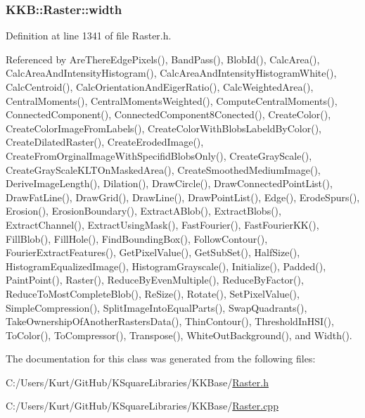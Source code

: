 \subsubsection[{\texorpdfstring{width}{width}}]{ K\+K\+B\+::\+Raster\+::width\hspace{0.3cm}{\ttfamily [protected]}}\hypertarget{class_k_k_b_1_1_raster_ae0bcc103e191c3421d7692dc69ceb554}{}\label{class_k_k_b_1_1_raster_ae0bcc103e191c3421d7692dc69ceb554}


Definition at line 1341 of file Raster.\+h.



Referenced by Are\+There\+Edge\+Pixels(), Band\+Pass(), Blob\+Id(), Calc\+Area(), Calc\+Area\+And\+Intensity\+Histogram(), Calc\+Area\+And\+Intensity\+Histogram\+White(), Calc\+Centroid(), Calc\+Orientation\+And\+Eiger\+Ratio(), Calc\+Weighted\+Area(), Central\+Moments(), Central\+Moments\+Weighted(), Compute\+Central\+Moments(), Connected\+Component(), Connected\+Component8\+Conected(), Create\+Color(), Create\+Color\+Image\+From\+Labels(), Create\+Color\+With\+Blobs\+Labeld\+By\+Color(), Create\+Dilated\+Raster(), Create\+Eroded\+Image(), Create\+From\+Orginal\+Image\+With\+Specifid\+Blobs\+Only(), Create\+Gray\+Scale(), Create\+Gray\+Scale\+K\+L\+T\+On\+Masked\+Area(), Create\+Smoothed\+Medium\+Image(), Derive\+Image\+Length(), Dilation(), Draw\+Circle(), Draw\+Connected\+Point\+List(), Draw\+Fat\+Line(), Draw\+Grid(), Draw\+Line(), Draw\+Point\+List(), Edge(), Erode\+Spurs(), Erosion(), Erosion\+Boundary(), Extract\+A\+Blob(), Extract\+Blobs(), Extract\+Channel(), Extract\+Using\+Mask(), Fast\+Fourier(), Fast\+Fourier\+K\+K(), Fill\+Blob(), Fill\+Hole(), Find\+Bounding\+Box(), Follow\+Contour(), Fourier\+Extract\+Features(), Get\+Pixel\+Value(), Get\+Sub\+Set(), Half\+Size(), Histogram\+Equalized\+Image(), Histogram\+Grayscale(), Initialize(), Padded(), Paint\+Point(), Raster(), Reduce\+By\+Even\+Multiple(), Reduce\+By\+Factor(), Reduce\+To\+Most\+Complete\+Blob(), Re\+Size(), Rotate(), Set\+Pixel\+Value(), Simple\+Compression(), Split\+Image\+Into\+Equal\+Parts(), Swap\+Quadrants(), Take\+Ownership\+Of\+Another\+Rasters\+Data(), Thin\+Contour(), Threshold\+In\+H\+S\+I(), To\+Color(), To\+Compressor(), Transpose(), White\+Out\+Background(), and Width().



The documentation for this class was generated from the following files\+:\begin{DoxyCompactItemize}
\item 
C\+:/\+Users/\+Kurt/\+Git\+Hub/\+K\+Square\+Libraries/\+K\+K\+Base/\hyperlink{_raster_8h}{Raster.\+h}\item 
C\+:/\+Users/\+Kurt/\+Git\+Hub/\+K\+Square\+Libraries/\+K\+K\+Base/\hyperlink{_raster_8cpp}{Raster.\+cpp}\end{DoxyCompactItemize}
